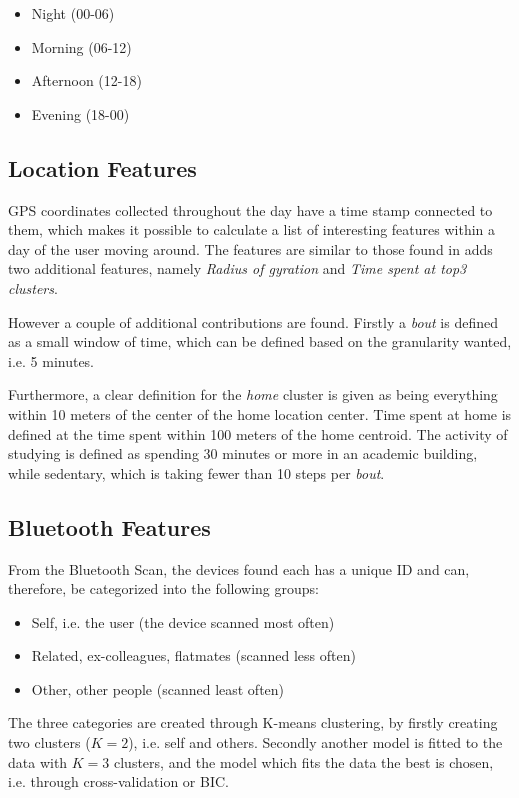 \begin{itemize}
\item Night (00-06)
\item Morning (06-12)
\item Afternoon (12-18)
\item Evening (18-00)
\end{itemize}

\subsection{Location Features}
GPS coordinates collected throughout the day have a time stamp connected to them, which makes it possible to calculate a list of interesting features within a day of the user moving around. The features are similar to those found in \cite{Saeb2015} adds two additional features, namely \textit{Radius of gyration} and \textit{Time spent at top3 clusters}.

However a couple of additional contributions are found. Firstly a \textit{bout} is defined as a small window of time, which can be defined based on the granularity wanted, i.e. 5 minutes. 

Furthermore, a clear definition for the \textit{home} cluster is given as being everything within 10 meters of the center of the home location center. Time spent at home is defined at the time spent within 100 meters of the home centroid. The activity of studying is defined as spending 30 minutes or more in an academic building, while sedentary, which is taking fewer than 10 steps per \textit{bout}.

\subsection{Bluetooth Features}
From the Bluetooth Scan, the devices found each has a unique ID and can, therefore, be categorized into the following groups:

\begin{itemize}
    \item Self, i.e. the user (the device scanned most often)
    \item Related, ex-colleagues, flatmates (scanned less often)
    \item Other, other people (scanned least often)
\end{itemize}

The three categories are created through K-means clustering, by firstly creating two clusters ($K=2$), i.e. self and others. Secondly another model is fitted to the data with $K=3$ clusters, and the model which fits the data the best is chosen, i.e. through cross-validation or BIC.



